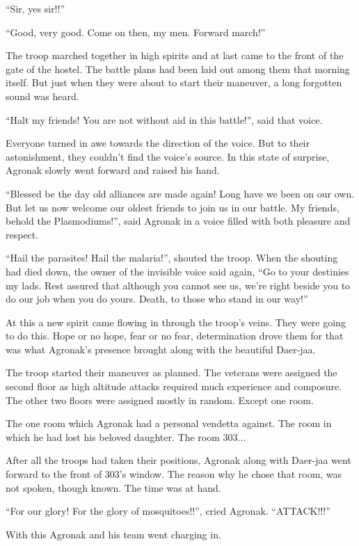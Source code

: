 \documentclass[twoside,11pt,titlepage]{article}
\begin{document}
``Sir, yes sir!!''

``Good, very good. Come on then, my men. Forward march!''

The troop marched together in high spirits and at last came to the front of the gate of the hostel. The battle plans had been laid out among them that morning itself. But just when they were about to start their maneuver, a long forgotten sound was heard.

``Halt my friends! You are not without aid in this battle!'', said that voice.

Everyone turned in awe towards the direction of the voice. But to their astonishment, they couldn't find the voice's source. In this state of surprise, Agronak slowly went forward and raised his hand.

``Blessed be the day old alliances are made again! Long have we been on our own. But let us now welcome our oldest friends to join us in our battle. My friends, behold the Plasmodiums!'', said Agronak in a voice filled with both pleasure and respect.

``Hail the parasites! Hail the malaria!'', shouted the troop. When the shouting had died down, the owner of the invisible voice said again, ``Go to your destinies my lads. Rest assured that although you cannot see us, we're right beside you to do our job when you do yours. Death, to those who stand in our way!''

At this a new spirit came flowing in through the troop's veins. They were going to do this. Hope or no hope, fear or no fear, determination drove them for that was what Agronak's presence brought along with the beautiful Daer-jaa.

The troop started their maneuver as planned. The veterans were assigned the second floor as high altitude attacks required much experience and composure. The other two floors were assigned mostly in random. Except one room.

The one room which Agronak had a personal vendetta against. The room in which he had lost his beloved daughter. The room 303...

After all the troops had taken their positions, Agronak along with Daer-jaa went forward to the front of 303's window. The reason why he chose that room, was not spoken, though known. The time was at hand.

``For our glory! For the glory of mosquitoes!!'', cried Agronak. ``ATTACK!!!''

With this Agronak and his team went charging in.
\end{document}
